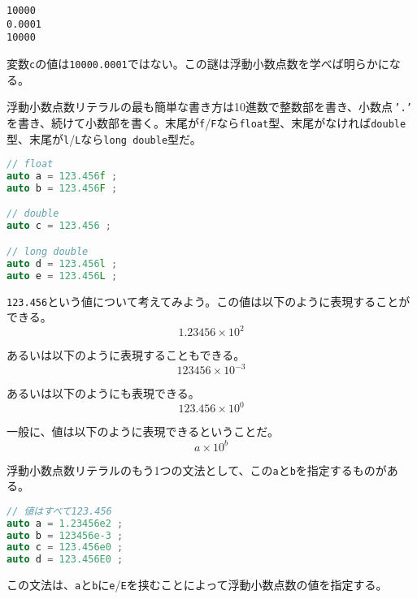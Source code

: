 \begin{lstlisting}[style=terminal]
10000
0.0001
10000
\end{lstlisting}

変数\texttt{c}の値は\texttt{10000.0001}ではない。この謎は浮動小数点数を学べば明らかになる。

\clearpage
{}


浮動小数点数リテラルの最も簡単な書き方は10進数で整数部を書き、小数点\,\texttt{'.'}\,を書き、続けて小数部を書く。末尾が\texttt{f}/\texttt{F}なら\texttt{float}型、末尾がなければ\texttt{double}型、末尾が\texttt{l}/\texttt{L}なら\texttt{long double}型だ。

\begin{lstlisting}[language={C++}]
// float
auto a = 123.456f ;
auto b = 123.456F ;

// double
auto c = 123.456 ;

// long double
auto d = 123.456l ;
auto e = 123.456L ;
\end{lstlisting}


\texttt{123.456}という値について考えてみよう。この値は以下のように表現することができる。
\[1.23456 \times 10^{2}\]

あるいは以下のように表現することもできる。
\[123456 \times 10^{-3}\]

あるいは以下のようにも表現できる。
\[123.456 \times 10^{0}\]

一般に、値は以下のように表現できるということだ。
\[a \times 10^{b}\]

浮動小数点数リテラルのもう1つの文法として、この\texttt{a}と\texttt{b}を指定するものがある。

\begin{lstlisting}[language={C++}]
// 値はすべて123.456
auto a = 1.23456e2 ;
auto b = 123456e-3 ;
auto c = 123.456e0 ;
auto d = 123.456E0 ;
\end{lstlisting}

この文法は、\texttt{a}と\texttt{b}に\texttt{e}/\texttt{E}を挟むことによって浮動小数点数の値を指定する。

